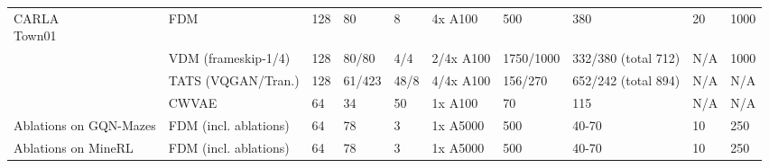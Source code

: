 \begin{table}[t]
\begin{tabular}{p{1.1cm}llp{0.9cm}p{0.6cm}lp{1cm}llp{0.7cm}}
    \midrule
    \multirowcell{4}[0pt][l]{CARLA\\Town01}
                                       &  FDM                       & 128   & 80    & 8     & 4x A100   & 500       & 380   & 20    & 1000      \\
                                       &  VDM (frameskip-1/4)       & 128   & 80/80 & 4/4   & 2/4x A100 & 1750/1000  & 332/380 (total 712)   & N/A  & 1000      \\
                                       &  TATS (VQGAN/Tran.)       & 128    & 61/423    & 48/8   & 4/4x A100   & 156/270    & 652/242 (total 894)     & N/A  & N/A      \\
                                       &  CWVAE                     & 64    & 34    & 50    & 1x A100   & 70      & 115   & N/A   & N/A      \\
   \midrule
    Ablations on GQN-Mazes   &  FDM (incl. ablations)     & 64    & 78    & 3     & 1x A5000  & 500       & 40-70  & 10    & 250      \\
   \midrule
    Ablations on MineRL  &  FDM (incl. ablations)     & 64    & 78    & 3     & 1x A5000  & 500       & 40-70  & 10    & 250      \\
    \bottomrule
  \end{tabular}
\end{table}

